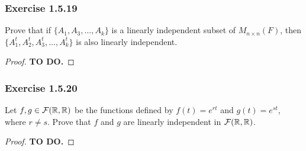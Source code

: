 \subsubsection{Exercise 1.5.19} Prove that if \( \{ A_{1}, A_{3}, \dots, A_{k} \}  \) is a linearly independent subset of \( M_{n \times n }(F) \), then \( \{ A^{t}_{1} , A^{t}_{2} , A^{t}_{3}, \dots, A^{t}_{k } \}  \) is also linearly independent.
\begin{proof}
\textbf{TO DO.}
\end{proof}

\subsubsection{Exercise 1.5.20} Let \( f,g \in \mathcal{F}(\mathbb{R} , \mathbb{R} ) \) be the functions defined by \( f(t) = e^{rt} \) and \( g(t) = e^{s t  } \), where \( r \neq s  \). Prove that \( f  \) and \( g  \) are linearly independent in \( \mathcal{F}(\mathbb{R} , \mathbb{R} ) \).
\begin{proof}
\textbf{TO DO.} 
\end{proof}


